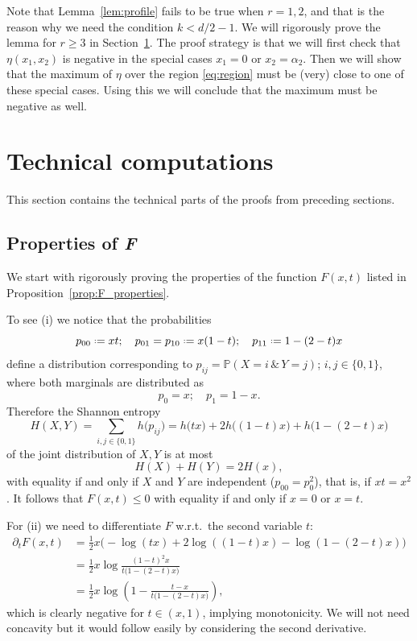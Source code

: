 \documentclass[12pt]{amsart}
\theoremstyle{definition}
\newcommand\Pb{\mathbb{P}}  %
\newcommand\al{\alpha}
\newcommand{\defeq}{\mathrel{\vcenter{\baselineskip0.5ex \lineskiplimit0pt
                     \hbox{\scriptsize.}\hbox{\scriptsize.}}}%
                     =}
\begin{document}
Note that Lemma~\ref{lem:profile} fails to be true when $r=1,2$, and that is the reason why we need the condition $k<d/2-1$. We will rigorously prove the lemma for $r \geq 3$ in Section~\ref{sec:technical}. The proof strategy is that we will first check that $\eta(x_1,x_2)$ is negative in the special cases $x_1=0$ or $x_2=\al_2$. Then we will show that the maximum of $\eta$ over the region \eqref{eq:region} must be (very) close to one of these special cases. Using this we will conclude that the maximum must be negative as well.


\section{Technical computations} \label{sec:technical}

This section contains the technical parts of the proofs from preceding sections. 
\subsection{Properties of \textit{F}} 
\label{sec:F_properties}

We start with rigorously proving the properties of the function $F(x,t)$ listed in Proposition~\ref{prop:F_properties}. 

To see (i) we notice that the probabilities 
%
\[ p_{00} \defeq xt; \quad 
p_{01} = p_{10} \defeq x(1-t); \quad 
p_{11} \defeq 1-(2-t)x \]
%
define a distribution corresponding to 
$p_{ij} = \Pb(X=i \,\&\, Y=j)$; $i,j \in \{0,1\}$, where both marginals are distributed
as 
%
\[ p_0=x; \quad p_1=1-x .\]
%
Therefore the Shannon entropy 
%
\[ H(X,Y) = \sum_{i,j \in \{0,1\}} h\big( p_{ij} \big) = h\big( tx \big) 
+ 2h\big( (1-t)x \big) 
+ h\big( 1-(2-t)x \big) \]
%
 of the joint distribution of $X,Y$ is at most 
\[ H(X)+H(Y) = 2 H(x) ,\]
with equality if and only if $X$ and $Y$ are independent ($p_{00}=p_0^2$), that is, if $xt=x^2$. It follows that $F(x,t) \leq 0$ with equality if and only if $x=0$ or $x=t$.

For (ii) we need to differentiate $F$ w.r.t.~the second variable $t$:  
%
\begin{align*}
\partial_t F(x,t) &= \frac12 x \bigg( - \log(t x) + 2 \log( (1-t)x) - \log(1-(2-t)x) \bigg) \\
&= \frac12 x \log \frac{(1-t)^2 x}{t \big( 1-(2-t)x \big)} \\
&= \frac12 x \log \left( 1- \frac{t-x}{t \big( 1-(2-t)x \big)} \right) ,
\end{align*}
%
which is clearly negative for $t \in (x,1)$, implying monotonicity. We will not need concavity but it would follow easily by considering the second derivative.
\end{document}
